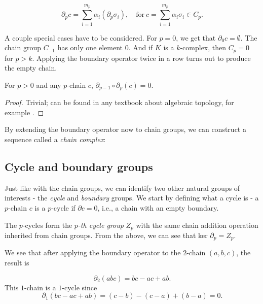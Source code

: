 \begin{equation*}
  \partial_{p}c = \sum_{i=1}^{m_{p}}\alpha_{i}(\partial_{p}\sigma_{i}), \quad \text{for} \: c = \sum_{i=1}^{m_{p}}\alpha_{i}\sigma_{i} \in C_{p}.
\end{equation*}

A couple special cases have to be considered. For $p = 0$, we get that $\partial_{0}c = \emptyset$. The chain group $C_{-1}$ has only one element $0$. And if $K$ is a $k$-complex, then $C_{p} = 0$ for $p>k$. Applying the boundary operator twice in a row turns out to produce the empty chain.

\begin{lemma}
  For $p>0$ and any $p$-chain $c$, $\partial_{p-1}\circ\partial_{p}(c) = 0$.
\end{lemma}

\begin{proof}
  Trivial; can be found in any textbook about algebraic topology, for example \cite{hatcher2002algebraic}.
\end{proof}

By extending the boundary operator now to chain groups, we can construct a sequence called a \textit{chain complex}:

\begin{figure}[h]
\end{figure}

\subsection{Cycle and boundary groups}
Just like with the chain groups, we can identify two other natural groups of interests - the \textit{cycle} and \textit{boundary} groups. We start by defining what a cycle is - a $p$-chain $c$ is a $p$-cycle if $\partial c = 0$, i.e., a chain with an empty boundary.

The $p$-cycles form the \textit{$p$-th cycle group} $Z_{p}$ with the same chain addition operation inherited from chain groups. From the above, we can see that ker $\partial_{p} = Z_{p}$.

We see that after applying the boundary operator to the $2$-chain $(a,b,c)$, the result is

\begin{equation*}
  \partial_2(abc) = bc - ac + ab.
\end{equation*}
This $1$-chain is a $1$-cycle since
\begin{equation*}
  \partial_{1}(bc - ac + ab) = (c-b) - (c-a) + (b-a) = 0.
\end{equation*}

